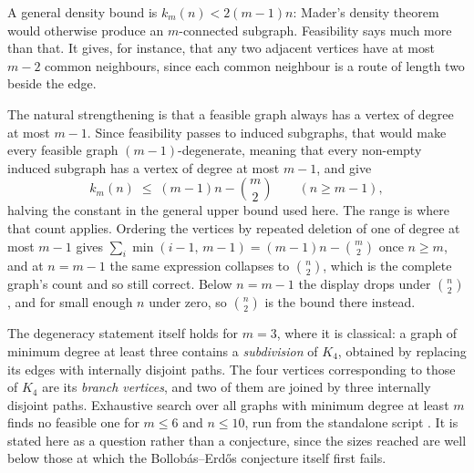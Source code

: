 \begin{remark}\label{rem:vertex-degeneracy}
A general density bound is $k_m(n) < 2(m-1)n$: Mader's density theorem \cite{Mader72} would otherwise produce an $m$-connected subgraph. Feasibility says much more than that. It gives, for instance, that any two adjacent vertices have at most $m-2$ common neighbours, since each common neighbour is a route of length two beside the edge.

The natural strengthening is that a feasible graph always has a vertex of degree at most $m-1$. Since feasibility passes to induced subgraphs, that would make every feasible graph $(m-1)$-degenerate, meaning that every non-empty induced subgraph has a vertex of degree at most $m-1$, and give
\[
    k_m(n) \;\le\; (m-1)n - \binom{m}{2}
    \qquad (n \ge m-1),
\]
halving the constant in the general upper bound used here. The range is where
that count applies. Ordering the vertices by repeated deletion of one of degree
at most $m-1$ gives $\sum_i \min(i-1,\,m-1) = (m-1)n - \binom{m}{2}$ once
$n \ge m$, and at $n = m-1$ the same expression collapses to $\binom{n}{2}$,
which is the complete graph's count and so still correct. Below $n = m-1$ the
display drops under $\binom{n}{2}$, and for small enough $n$ under zero, so
$\binom{n}{2}$ is the bound there instead.

The degeneracy statement itself holds for
$m = 3$, where it is classical: a graph of minimum degree at least three
contains a \emph{subdivision} of $K_4$, obtained by replacing its edges with
internally disjoint paths. The four vertices corresponding to those of $K_4$
are its \emph{branch vertices}, and two of them are joined by three internally
disjoint paths. Exhaustive search over all graphs with minimum degree at least
$m$ finds no feasible one for $m \le 6$ and $n \le 10$, run from the standalone script
. It is stated here as a
question rather than a conjecture, since the sizes reached are well below those
at which the Bollob\'as--Erd\H{o}s conjecture itself first fails.
\end{remark}



